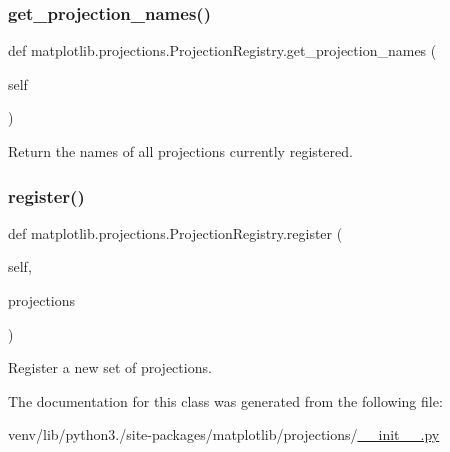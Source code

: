 \subsubsection{\texorpdfstring{get\+\_\+projection\+\_\+names()}{get\_projection\_names()}}
{\footnotesize\ttfamily def matplotlib.\+projections.\+Projection\+Registry.\+get\+\_\+projection\+\_\+names (\begin{DoxyParamCaption}\item[{}]{self }\end{DoxyParamCaption})}

\begin{DoxyVerb}Return the names of all projections currently registered.\end{DoxyVerb}
 \mbox{\label{classmatplotlib_1_1projections_1_1ProjectionRegistry_a62a2e01e1d7ce444191f0f7fdfc28a0a}} 
\subsubsection{\texorpdfstring{register()}{register()}}
{\footnotesize\ttfamily def matplotlib.\+projections.\+Projection\+Registry.\+register (\begin{DoxyParamCaption}\item[{}]{self,  }\item[{}]{projections }\end{DoxyParamCaption})}

\begin{DoxyVerb}Register a new set of projections.\end{DoxyVerb}
 

The documentation for this class was generated from the following file\+:\begin{DoxyCompactItemize}
\item 
venv/lib/python3./site-\/packages/matplotlib/projections/\hyperlink{venv_2lib_2python3_89_2site-packages_2matplotlib_2projections_2____init_____8py}{\+\_\+\+\_\+init\+\_\+\+\_\+.\+py}\end{DoxyCompactItemize}

